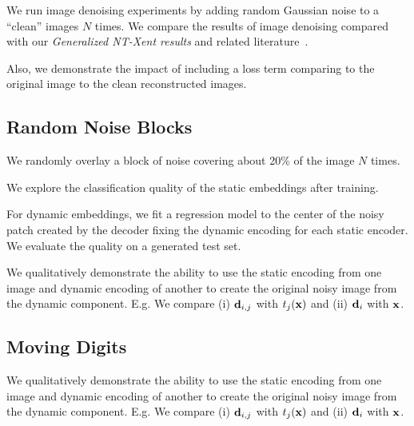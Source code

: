 \documentclass[11pt]{article}
\begin{document}
We run image denoising experiments by adding random Gaussian noise to a ``clean'' images $N$ times. We compare the results of image denoising compared with our \emph{Generalized NT-Xent results} and related literature~\cite{xia2019training,metzler2016denoising,li2013efficient}.

Also, we demonstrate the impact of including a loss term comparing to the original image to the clean reconstructed images.

\subsection{Random Noise Blocks}\label{subsec:disent_mnist_noise_block}

We randomly overlay a block of noise covering about 20\% of the image $N$ times. 

We explore the classification quality of the static embeddings after training.

For dynamic embeddings, we fit a regression model to the center of the noisy patch created by the decoder fixing the dynamic encoding  for each static encoder. We evaluate the quality on a generated test set.

We qualitatively demonstrate the ability to use the static encoding from one image and dynamic encoding of another to create the original noisy image from the dynamic component. E.g. We compare (i) $\boldsymbol{\mathrm{d}}_{i,j}$ with $t_j(\boldsymbol{\mathrm{x}})$ and (ii) $\boldsymbol{\mathrm{d}}_{i}$ with $\boldsymbol{\mathrm{x}}$.

\subsection{Moving Digits}\label{subsec:disent_mnist_motion}

We qualitatively demonstrate the ability to use the static encoding from one image and dynamic encoding of another to create the original noisy image from the dynamic component. E.g. We compare (i) $\boldsymbol{\mathrm{d}}_{i,j}$ with $t_j(\boldsymbol{\mathrm{x}})$ and (ii) $\boldsymbol{\mathrm{d}}_{i}$ with $\boldsymbol{\mathrm{x}}$.


\newpage



\end{document}
